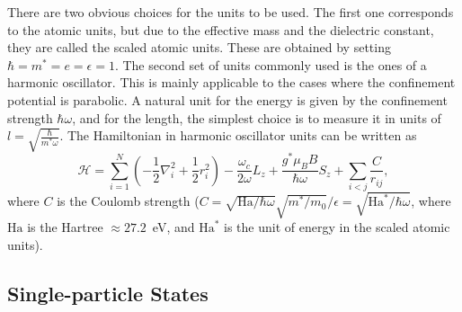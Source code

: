 \documentclass{article}
\begin{document}
There are two obvious choices for the units to be used. The first one
corresponds to the atomic units, but due to the effective mass and the
dielectric constant, they are called the scaled atomic units. These are
obtained by setting $\hbar=m^*=e=\epsilon=1$.
The second set of units commonly used is the ones of a harmonic
oscillator.  This is mainly applicable to the cases where the
confinement potential is parabolic. A natural unit for the energy is
given by the confinement strength $\hbar \omega$, and for the length,
the simplest choice is to measure it in units of
$l=\sqrt{\frac{\hbar}{m^{*}\omega}}$.  The Hamiltonian in harmonic
oscillator units can be written as
\begin{equation}
\mathcal{H} = \sum _{i=1}^N\left ( -\frac12 \nabla_{i}^{2} +
\frac12 r_{i}^{2} \right ) - \frac{\omega_c}{2 \omega} L_{z} +
\frac{g^* \mu_B B}{\hbar\omega} S_{z} + \sum_{i < j}
\frac{C}{r_{ij}} ,
\label{reH}
\end{equation}
where 
$C$ is the Coulomb strength ($C=\sqrt{{\mathrm{ Ha}}/{\hbar\omega}}
{\sqrt{m^*/m_0}}/{\epsilon}=\sqrt{\mathrm{Ha}^*/\hbar\omega} $, where
$\mathrm{Ha}$ is the Hartree $\approx27.2$~eV, and $\mathrm{Ha}^*$ is the unit
of energy in the scaled atomic units).

\subsection{Single-particle States}
\end{document}
